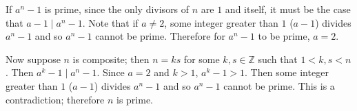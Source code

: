 \documentclass{article}
\begin{document}
If $a^n - 1$ is prime, since the only divisors of $n$ are $1$ and itself, it must be the case that $a - 1 \mid a^n - 1$. Note that if $a \neq 2$, some integer greater than $1$ ($a - 1$) divides $a^n - 1$ and so $a^n - 1$ cannot be prime. Therefore for $a^n - 1$ to be prime, $a = 2$.

Now suppose $n$ is composite; then $n = ks$ for some $k, s \in \mathbb{Z}$ such that $1 < k, s < n$. Then $a^k - 1 \mid a^n - 1$. Since $a = 2$ and $k > 1$, $a^k - 1 > 1$. Then some integer greater than $1$ ($a - 1$) divides $a^n - 1$ and so $a^n - 1$ cannot be prime. This is a contradiction; therefore $n$ is prime.
\end{document}
